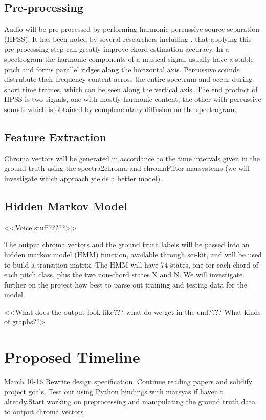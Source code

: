 \documentclass{article}
\begin{document}
\subsection{Pre-processing}
Audio will be pre processed by performing harmonic percussive source separation (HPSS). It has been noted by several researchers including \cite{Reed:09}, that applying
this pre processing step can greatly improve chord estimation accuracy. In a spectrogram the harmonic components of a musical signal
usually have a stable pitch and forms parallel ridges along the horizontal axis. Percussive sounds distrubute their frequency content across the
entire spectrum and occur during short time trames, which can be seen along the vertical axis. The end product of HPSS is two signals,
one with mostly harmonic content, the other with percussive sounds which is obtained by
complementary diffusion on the spectrogram.


\subsection{Feature Extraction}

Chroma vectors will be generated in accordance to the time intervals given in the ground truth using the spectra2chroma and chromaFilter marsystems (we will investigate which approach
yields a better model).

\subsection{Hidden Markov Model}

<<Voice stuff?????>>

The output chroma vectors and the ground truth labels will be passed into an hidden markov model (HMM) function, available through
sci-kit, and will be used to build a transition matrix. The HMM will have 74 states, one for each chord of each
pitch class, plus the two non-chord states X and N. We will investigate further on the project how best
to parse out training and testing data for the model.

<<What does the output look like??? what do we get in the end???? What kinds of graphs??>


\section{Proposed Timeline}\label{sec:timeline}

March 10-16\newline
Rewrite design specification. Continue reading papers and solidify project goals. Test out using Python 
bindings with marsyas if haven't already.Start working on preprocessing and 
manipulating the ground truth data to output chroma vectors\newline
\newline
\end{document}
